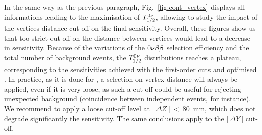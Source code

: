 In the same way as the previous paragraph, Fig.~\ref{fig:cont_vertex} displays all informations leading to the maximisation of $T_{1/2}^{0\nu}$, allowing to study the impact of the vertices distance cut-off on the final sensitivity.
Overall, these figures show us that too strict cut-off on the distance between vertices would lead to a decrease in sensitivity.
Because of the variations of the $0\nu\beta\beta$ selection efficiency and the total number of background events, the $T_{1/2}^{0\nu}$ distributions reaches a plateau, corresponding to the sensitivities achieved with the first-order cuts and optimised \Pint.
In practice, as it is done for \Pint, a selection on vertex distance will always be applied, even if it is very loose, as such a cut-off could be useful for rejecting unexpected background (coincidence between independent events, for instance).
We recommend to apply a loose cut-off level at $|~\Delta Z~|~<~80$~mm, which does not degrade significantly the sensitivity.
The same conclusions apply to the $|~\Delta Y~|$ cut-off.
